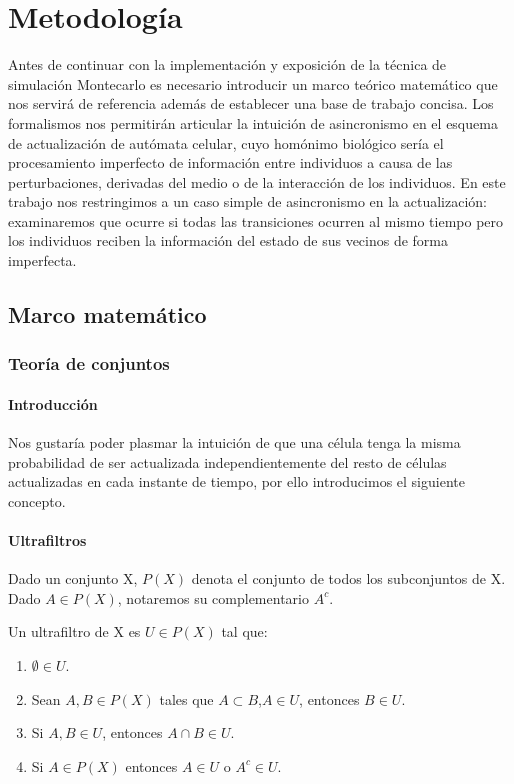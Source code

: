 \documentclass[../proyecto.tex]{memoir}
\begin{document}
\chapter{Metodología}

Antes de continuar con la implementación y exposición de la técnica de simulación Montecarlo es necesario introducir un marco teórico matemático que nos servirá de referencia además de establecer una base de trabajo concisa. Los formalismos nos permitirán articular la intuición de asincronismo en el esquema de actualización de autómata celular, cuyo homónimo biológico sería el procesamiento imperfecto de información entre individuos a causa de las perturbaciones, derivadas del medio o de la interacción de los individuos. En este trabajo nos restringimos a un caso simple de asincronismo en la actualización: examinaremos que ocurre si todas las transiciones ocurren al mismo tiempo pero los individuos reciben la información del estado de sus vecinos de forma imperfecta.

\section{Marco matemático}

\subsection{Teoría de conjuntos}

\subsubsection{Introducción}

Nos gustaría poder plasmar la intuición de que una célula tenga la misma probabilidad de ser actualizada independientemente del resto de células actualizadas en cada instante de tiempo, por ello introducimos el siguiente concepto. 

\subsubsection{Ultrafiltros}
Dado un conjunto X, $P(X)$ denota el conjunto de todos los subconjuntos de X. Dado $A \in P(X)$, notaremos su complementario $A^{c}$. 

Un ultrafiltro de X es $U \in P(X)$ tal que:

\begin{enumerate}
\item $\emptyset \in U$.
\item Sean $A,B \in P(X)$ tales que $A \subset B$,$ A \in U$, entonces $B \in U$.
\item Si $A,B \in U$, entonces $A \cap B \in U$.
\item Si $A \in P(X)$ entonces $A \in U$ o $ A^{c} \in U$.
\end{enumerate}
\end{document}
